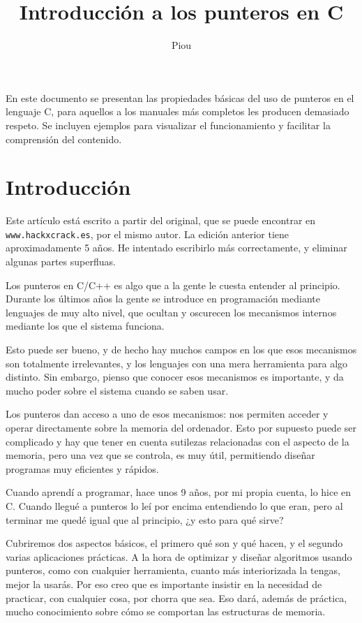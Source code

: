 \documentclass{hxc_cl}
\begin{document}
\title{Introducción a los punteros en C}
\author{Piou}
\date{}
\maketitle
\begin{resumen}
En este documento se presentan las propiedades básicas del uso de punteros en el lenguaje C, para aquellos a los manuales más completos les producen demasiado respeto. Se incluyen ejemplos para visualizar el funcionamiento y facilitar la comprensión del contenido.
\end{resumen}

\section{Introducción}
Este artículo está escrito a partir del original, que se puede encontrar en \texttt{www.hackxcrack.es}, por el mismo autor. La edición anterior tiene aproximadamente 5 años. He intentado escribirlo más correctamente, y eliminar algunas partes superfluas.

Los punteros en C/C++ es algo que a la gente le cuesta entender al principio. Durante los últimos años la gente se introduce en programación mediante lenguajes de muy alto nivel, que ocultan y oscurecen los mecanismos internos mediante los que el sistema funciona.

Esto puede ser bueno, y de hecho hay muchos campos en los que esos mecanismos son totalmente irrelevantes, y los lenguajes con una mera herramienta para algo distinto. Sin embargo, pienso que conocer esos mecanismos es importante, y da mucho poder sobre el sistema cuando se saben usar. 

Los punteros dan acceso a uno de esos mecanismos: nos permiten acceder y operar directamente sobre la memoria del ordenador. Esto por supuesto puede ser complicado y hay que tener en cuenta sutilezas relacionadas con el aspecto de la memoria, pero una vez que se controla, es muy útil, permitiendo diseñar programas muy eficientes y rápidos.

Cuando aprendí a programar, hace unos 9 años, por mi propia cuenta, lo hice en C. Cuando llegué a punteros lo leí por encima entendiendo lo que eran, pero al terminar me quedé igual que al principio, ¿y esto para qué sirve?

Cubriremos dos aspectos básicos, el primero qué son y qué hacen, y el segundo varias aplicaciones prácticas. A la hora de optimizar y diseñar algoritmos usando punteros, como con cualquier herramienta, cuanto más interiorizada la tengas, mejor la usarás. Por eso creo que es importante insistir en la necesidad de practicar, con cualquier cosa, por chorra que sea. Eso dará, además de práctica, mucho conocimiento sobre cómo se comportan las estructuras de memoria.
\end{document}

